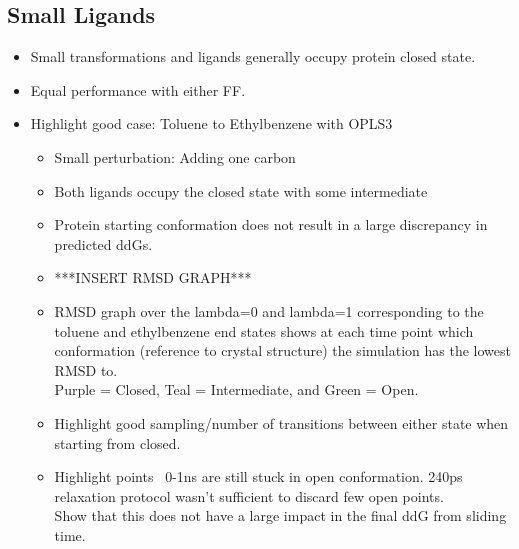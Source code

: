 \documentclass[journal=jctcce,manuscript=article]{achemso}
\begin{document}
\begin{suppinfo}
\subsection{Small Ligands}
   \begin{itemize}
   \item Small transformations and ligands generally occupy protein closed state.
   \item Equal performance with either FF.
   \item Highlight good case: Toluene to Ethylbenzene with OPLS3
      \begin{itemize}
      \item Small perturbation: Adding one carbon
      \item Both ligands occupy the closed state with some intermediate
      \item Protein starting conformation does not result in a large discrepancy in predicted ddGs.
      \item ***INSERT RMSD GRAPH***
      \item RMSD graph over the lambda=0 and lambda=1 corresponding to the toluene and ethylbenzene end states shows at each time point which conformation (reference to crystal structure) the simulation has the lowest RMSD to.
         \\ Purple = Closed, Teal = Intermediate, and Green = Open.
      \item Highlight good sampling/number of transitions between either state when starting from closed.
      \item Highlight points ~0-1ns are still stuck in open conformation. 240ps relaxation protocol wasn't sufficient to discard few open points.
         \\ Show that this does not have a large impact in the final ddG from sliding time.
      \end{itemize}


\end{itemize}
\end{suppinfo}
\end{document}
